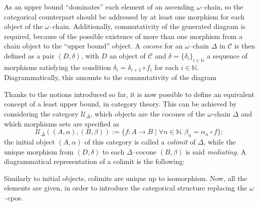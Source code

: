 As an upper bound ``dominates'' each element of an ascending \(\omega\)--chain, so the categorical counterpart should be addressed by at least one morphism for each object of the \(\omega\)--chain.%
Additionally, commutativity of the generated diagram is required, because of the possible existence of more than one morphism from a chain object to the ``upper bound'' object.
A \emph{cocone} for an \(\omega\)--chain \(\Delta\) in \(\mathcal{C}\) is then defined as a pair \((D, \delta)\), with \(D\) an object of \(\mathcal{C}\) and \(\delta = \lbrace\delta_i\rbrace_{i \in \mathbb{N}}\) a sequence of morphisms satisfying the condition \(\delta_i = \delta_{i+1} \circ f_i\) for each \(i \in \mathbb{N}\). Diagrammatically, this amounts to the commutativity of the diagram
  \begin{center}
  \end{center}

Thanks to the notions introduced so far, it is now possible to define an equivalent concept of a least upper bound, in category theory.
This can be achieved by considering the category \(\mathcal{U}_\Delta\), which objects are the cocones of the \(\omega\)-chain \(\Delta\) and which morphisms sets are specified as
\begin{equation*}
  \mathcal{U}_\Delta((A,\alpha),(B,\beta)) := \lbrace f \colon A \to B \mid
  \forall n \in \mathbb{N}.\,\beta_n = \alpha_n \circ f \rbrace;
\end{equation*}
the initial object \((A, \alpha)\) of this category is called a \emph{colimit} of \(\Delta\), while the unique morphism from \((D,\delta)\) to each \(\Delta\)--cocone \((B, \beta)\) is said \emph{mediating}.%
A diagrammatical representation of a colimit is the following:
\begin{center}
\end{center}
Similarly to initial objects, colimits are unique up to isomorphism.
Now, all the elements are given, in order to introduce the categorical structure replacing the \(\omega\)--cpos.

